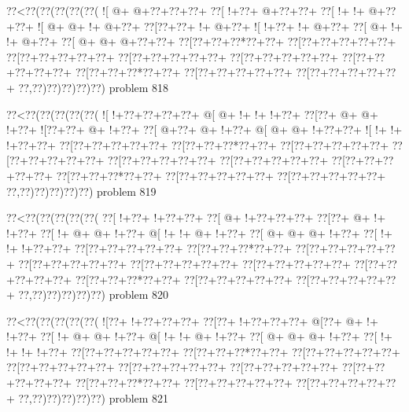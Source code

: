 \vbox{\vbox{\goo
\0??<\0??(\0??(\0??(\0??(\0??(
\- ![\- @+\- @+\0??+\0??+\0??+
\0??[\- !+\0??+\- @+\0??+\0??+
\0??[\- !+\- !+\- @+\0??+\0??+
\- ![\- @+\- @+\- !+\- @+\0??+
\0??[\0??+\0??+\- !+\- @+\0??+
\- ![\- !+\0??+\- !+\- @+\0??+
\0??[\- @+\- !+\- !+\- @+\0??+
\0??[\- @+\- @+\- @+\0??+\0??+
\0??[\0??+\0??+\0??*\0??+\0??+
\0??[\0??+\0??+\0??+\0??+\0??+
\0??[\0??+\0??+\0??+\0??+\0??+
\0??[\0??+\0??+\0??+\0??+\0??+
\0??[\0??+\0??+\0??+\0??+\0??+
\0??[\0??+\0??+\0??+\0??+\0??+
\0??[\0??+\0??+\0??*\0??+\0??+
\0??[\0??+\0??+\0??+\0??+\0??+
\0??[\0??+\0??+\0??+\0??+\0??+
\0??,\0??)\0??)\0??)\0??)\0??)
}
\hfil problem 818\hfil\break
}

\vbox{\vbox{\goo
\0??<\0??(\0??(\0??(\0??(\0??(
\- ![\- !+\0??+\0??+\0??+\0??+
\- @[\- @+\- !+\- !+\- !+\0??+
\0??[\0??+\- @+\- @+\- !+\0??+
\- ![\0??+\0??+\- @+\- !+\0??+
\0??[\- @+\0??+\- @+\- !+\0??+
\- @[\- @+\- @+\- !+\0??+\0??+
\- ![\- !+\- !+\- !+\0??+\0??+
\0??[\0??+\0??+\0??+\0??+\0??+
\0??[\0??+\0??+\0??*\0??+\0??+
\0??[\0??+\0??+\0??+\0??+\0??+
\0??[\0??+\0??+\0??+\0??+\0??+
\0??[\0??+\0??+\0??+\0??+\0??+
\0??[\0??+\0??+\0??+\0??+\0??+
\0??[\0??+\0??+\0??+\0??+\0??+
\0??[\0??+\0??+\0??*\0??+\0??+
\0??[\0??+\0??+\0??+\0??+\0??+
\0??[\0??+\0??+\0??+\0??+\0??+
\0??,\0??)\0??)\0??)\0??)\0??)
}
\hfil problem 819\hfil\break
}

\vbox{\vbox{\goo
\0??<\0??(\0??(\0??(\0??(\0??(
\0??[\- !+\0??+\- !+\0??+\0??+
\0??[\- @+\- !+\0??+\0??+\0??+
\0??[\0??+\- @+\- !+\- !+\0??+
\0??[\- !+\- @+\- @+\- !+\0??+
\- @[\- !+\- !+\- @+\- !+\0??+
\0??[\- @+\- @+\- @+\- !+\0??+
\0??[\- !+\- !+\- !+\0??+\0??+
\0??[\0??+\0??+\0??+\0??+\0??+
\0??[\0??+\0??+\0??*\0??+\0??+
\0??[\0??+\0??+\0??+\0??+\0??+
\0??[\0??+\0??+\0??+\0??+\0??+
\0??[\0??+\0??+\0??+\0??+\0??+
\0??[\0??+\0??+\0??+\0??+\0??+
\0??[\0??+\0??+\0??+\0??+\0??+
\0??[\0??+\0??+\0??*\0??+\0??+
\0??[\0??+\0??+\0??+\0??+\0??+
\0??[\0??+\0??+\0??+\0??+\0??+
\0??,\0??)\0??)\0??)\0??)\0??)
}
\hfil problem 820\hfil\break
}

\vbox{\vbox{\goo
\0??<\0??(\0??(\0??(\0??(\0??(
\- ![\0??+\- !+\0??+\0??+\0??+
\0??[\0??+\- !+\0??+\0??+\0??+
\- @[\0??+\- @+\- !+\- !+\0??+
\0??[\- !+\- @+\- @+\- !+\0??+
\- @[\- !+\- !+\- @+\- !+\0??+
\0??[\- @+\- @+\- @+\- !+\0??+
\0??[\- !+\- !+\- !+\- !+\0??+
\0??[\0??+\0??+\0??+\0??+\0??+
\0??[\0??+\0??+\0??*\0??+\0??+
\0??[\0??+\0??+\0??+\0??+\0??+
\0??[\0??+\0??+\0??+\0??+\0??+
\0??[\0??+\0??+\0??+\0??+\0??+
\0??[\0??+\0??+\0??+\0??+\0??+
\0??[\0??+\0??+\0??+\0??+\0??+
\0??[\0??+\0??+\0??*\0??+\0??+
\0??[\0??+\0??+\0??+\0??+\0??+
\0??[\0??+\0??+\0??+\0??+\0??+
\0??,\0??)\0??)\0??)\0??)\0??)
}
\hfil problem 821\hfil\break
}

